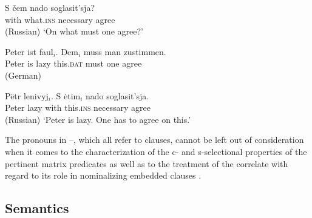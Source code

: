 \documentclass[output=paper,
colorlinks,
citecolor=brown,
newtxmath
]{langscibook}
\begin{document}
\ea\label{ex:10}
    \gll S čem nado soglasit'sja? \\
    with what.\textsc{ins} necessary agree\\ \hfill (Russian)
    \glt `On what must one agree?'
\z

\ea \label{ex:11}
    \ea\gll Peter ist faul$_i$. Dem$_i$ muss man zustimmen. \label{ex:11a} \\
    Peter is lazy this.\textsc{dat} must one agree\\ \hfill (German)

    \ex\gll Pëtr lenivyj$_i$. S ėtim$_i$ nado soglasit'sja.  \label{ex:11b} \\
    Peter lazy with this.\textsc{ins} necessary agree\\ \hfill (Russian)
\z
    \glt `Peter is lazy. One has to agree on this.'
\z

\noindent The pronouns in --, which all refer to clauses, cannot be left out of consideration when it comes to the characterization of the c- and s-selectional properties of the pertinent matrix predicates as well as to the treatment of the correlate with regard to its role in nominalizing embedded clauses \citep[see][]{Zimmermann2019c}.


\subsection{Semantics}\label{s:2.2}
\end{document}
